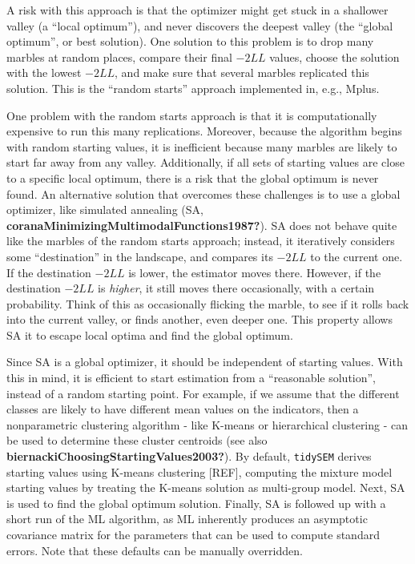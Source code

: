 \documentclass[
  ,man,floatsintext]{apa6}
\begin{document}
A risk with this approach is that the optimizer might get stuck in a
shallower valley (a ``local optimum''), and never discovers the deepest
valley (the ``global optimum'', or best solution). One solution to this
problem is to drop many marbles at random places, compare their final
\(-2LL\) values, choose the solution with the lowest \(-2LL\), and make sure
that several marbles replicated this solution. This is the ``random
starts'' approach implemented in, e.g., Mplus.

One problem with the random starts approach is that it is
computationally expensive to run this many replications. Moreover,
because the algorithm begins with random starting values, it is
inefficient because many marbles are likely to start far away from any
valley. Additionally, if all sets of starting values are close to a
specific local optimum, there is a risk that the global optimum is never
found. An alternative solution that overcomes these challenges is to use
a global optimizer, like simulated annealing (SA, \textbf{coranaMinimizingMultimodalFunctions1987?}). SA does not behave quite like
the marbles of the random starts approach; instead, it iteratively
considers some ``destination'' in the landscape, and compares its \(-2LL\)
to the current one. If the destination \(-2LL\) is lower, the estimator
moves there. However, if the destination \(-2LL\) is \emph{higher}, it still
moves there occasionally, with a certain probability. Think of this as
occasionally flicking the marble, to see if it rolls back into the
current valley, or finds another, even deeper one. This property allows
SA it to escape local optima and find the global optimum.

Since SA is a global optimizer, it should be independent of starting
values. With this in mind, it is efficient to start estimation from a
``reasonable solution'', instead of a random starting point. For example,
if we assume that the different classes are likely to have different
mean values on the indicators, then a nonparametric clustering
algorithm - like K-means or hierarchical clustering - can be used to
determine these cluster centroids (see also \textbf{biernackiChoosingStartingValues2003?}). By default, \texttt{tidySEM} derives
starting values using K-means clustering {[}REF{]}, computing the mixture
model starting values by treating the K-means solution as multi-group
model. Next, SA is used to find the global optimum solution. Finally, SA
is followed up with a short run of the ML algorithm, as ML inherently
produces an asymptotic covariance matrix for the parameters that can be
used to compute standard errors. Note that these defaults can be
manually overridden.
\end{document}
